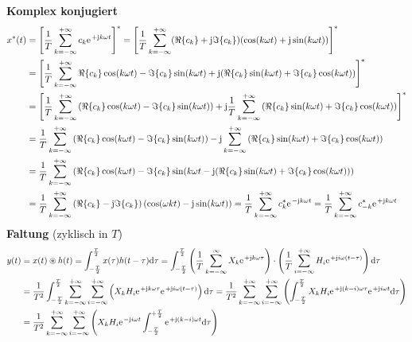 \documentclass[11pt,a4paper,DIV=12]{scrartcl}
\begin{document}
\textbf{Komplex konjugiert}
\begin{align}
	x^*(t)&=\left [\frac{1}{T}\sum_{k=-\infty}^{+\infty}c_k\e^{+\im k \omega t}\right ]^*=\left [\frac{1}{T}\sum_{k=-\infty}^{+\infty}(\Re\{c_k\}+\im\Im\{c_k\})(\cos(k\omega t)+\im\sin(k\omega t))\right ]^*\nonumber \\
	&=\left [\frac{1}{T}\sum_{k=-\infty}^{+\infty}\Re\{c_k\}\cos(k\omega t)-\Im\{c_k\}\sin(k\omega t)+\im (\Re\{c_k\}\sin(k\omega t)+\Im\{c_k\}\cos(k\omega t)) \right ]^*\nonumber \\
	&=\left [\frac{1}{T}\sum_{k=-\infty}^{+\infty}\left (\Re\{c_k\}\cos(k\omega t)-\Im\{c_k\}\sin(k\omega t)\right )+\im\frac{1}{T}\sum_{k=-\infty}^{+\infty}\left (\Re\{c_k\}\sin(k\omega t)+\Im\{c_k\}\cos(k\omega t)\right )\right ]^*\nonumber \\
	&=\frac{1}{T}\sum_{k=-\infty}^{+\infty}\left (\Re\{c_k\}\cos(k\omega t)-\Im\{c_k\}\sin(k\omega t)\right )-\im\sum_{k=-\infty}^{+\infty}\left (\Re\{c_k\}\sin(k\omega t)+\Im\{c_k\}\cos(k\omega t)\right )\nonumber \\
	&=\frac{1}{T}\sum_{k=-\infty}^{+\infty}\left (\Re\{c_k\}\cos(k\omega t)-\Im\{c_k\}\sin(k\omega t-\im(\Re\{c_k\}\sin(k\omega t)+\Im\{c_k\}\cos(k\omega t))\right )\nonumber \\
	&=\frac{1}{T}\sum_{k=-\infty}^{+\infty}\left(\Re\{c_k\}-\im\Im\{c_k\}\right)\left(\cos(\omega k t)-\im\sin(k\omega t) \right)=\frac{1}{T}\sum_{k=-\infty}^{+\infty}c_k^*\e^{-\im k \omega t}
	= \frac{1}{T}\sum_{k=-\infty}^{+\infty}c_{-k}^*\e^{+\im k \omega t}
\end{align}
\textbf{Faltung} (zyklisch in $T$)
\begin{align}
	y(t)&=x(t)\circledast h(t)
	=\int_{-\frac{T}{2}}^{\frac{T}{2}}x(\tau)h(t-\tau)\diff \tau
	=\int_{-\frac{T}{2}}^{\frac{T}{2}}\left (\frac{1}{T}\sum_{k=-\infty}^{\infty}X_k\e^{+\im k \omega \tau}\right )\cdot \left (\frac{1}{T}\sum_{i=-\infty}^{+\infty}H_i\e^{+\im i \omega (t-\tau)}\right )\diff \tau\nonumber \\
	&=\frac{1}{T^2}\int_{-\frac{T}{2}}^{\frac{T}{2}}\sum_{k=-\infty}^{+\infty}\sum_{i=-\infty}^{+\infty}\left (X_kH_i\e^{+\im k \omega \tau}\e^{+\im i \omega (t-\tau)}\right )\diff \tau
	=\frac{1}{T^2}\sum_{k=-\infty}^{+\infty}\sum_{i=-\infty}^{+\infty}\left (\int_{-\frac{T}{2}}^{\frac{T}{2}}X_kH_i\e^{+\im (k-i) \omega \tau}\e^{+\im i \omega t}\diff \tau\right )\nonumber \\
	&=\frac{1}{T^2}\sum_{k=-\infty}^{+\infty}\sum_{i=-\infty}^{+\infty}\left (X_kH_i\e^{-\im i \omega t}\int_{-\frac{T}{2}}^{+\frac{T}{2}}\e^{+\im (k-i)\omega t}\diff \tau \right )
\end{align}
\end{document}
